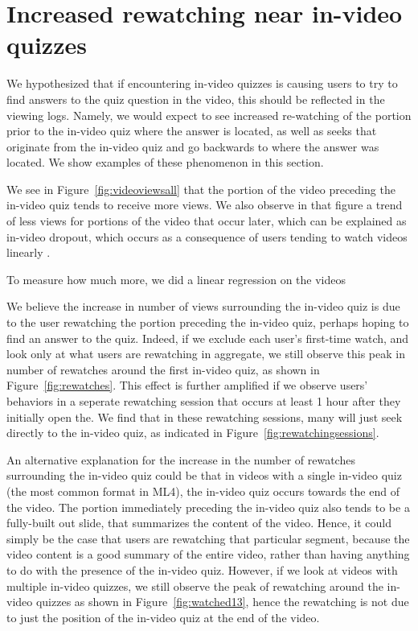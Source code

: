 \documentclass[letterpaper]{article}
\begin{document}
\section{Increased rewatching near in-video quizzes}

We hypothesized that if encountering in-video quizzes is causing users to try to find answers to the quiz question in the video, this should be reflected in the viewing logs. Namely, we would expect to see increased re-watching of the portion prior to the in-video quiz where the answer is located, as well as seeks that originate from the in-video quiz and go backwards to where the answer was located. We show examples of these phenomenon in this section.

We see in Figure~\ref{fig:videoviewsall} that the portion of the video preceding the in-video quiz tends to receive more views. We also observe in that figure a trend of less views for portions of the video that occur later, which can be explained as in-video dropout, which occurs as a consequence of users tending to watch videos linearly \cite{juho}.

To measure how much more, we did a linear regression on the videos

We believe the increase in number of views surrounding the in-video quiz is due to the user rewatching the portion preceding the in-video quiz, perhaps hoping to find an answer to the quiz. Indeed, if we exclude each user's first-time watch, and look only at what users are rewatching in aggregate, we still observe this peak in number of rewatches around the first in-video quiz, as shown in Figure~\ref{fig:rewatches}. This effect is further amplified if we observe users' behaviors in a seperate rewatching session that occurs at least 1 hour after they initially open the. We find that in these rewatching sessions, many will just seek directly to the in-video quiz, as indicated in Figure~\ref{fig:rewatchingsessions}.

An alternative explanation for the increase in the number of rewatches surrounding the in-video quiz could be that in videos with a single in-video quiz (the most common format in ML4), the in-video quiz occurs towards the end of the video. The portion immediately preceding the in-video quiz also tends to be a fully-built out slide, that summarizes the content of the video. Hence, it could simply be the case that users are rewatching that particular segment, because the video content is a good summary of the entire video, rather than having anything to do with the presence of the in-video quiz. However, if we look at videos with multiple in-video quizzes, we still observe the peak of rewatching around the in-video quizzes as shown in Figure~\ref{fig:watched13}, hence the rewatching is not due to just the position of the in-video quiz at the end of the video.
\end{document}
